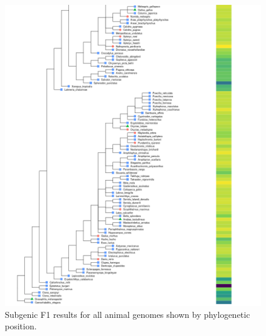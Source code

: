 \documentclass{article}
\begin{document}
\begin{figure}[!h]
\renewcommand\thefigure{S1}
\centerline{\includegraphics[width=1.2\textwidth]{images/animals_f1_scores_part2}}
\caption{Subgenic F1 results for all animal genomes shown by phylogenetic position.}
\end{figure}
\end{document}
